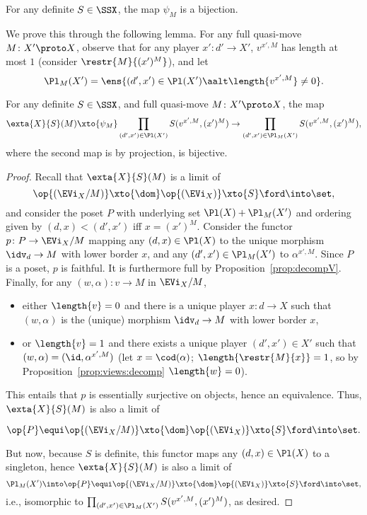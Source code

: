 \documentclass{LMCS}
\theoremstyle{plain}\newtheorem{satz}[thm]{Satz}
\begin{document}
\begin{prop}\label{prop:SM:SdotM}
  For any definite $S \in \SSX$, the map $\psi_M$ is a bijection.
\end{prop}
We prove this through the following lemma.
For any full quasi-move $M \colon X' \proto X$, observe that for any
player $x' \colon d' \to X'$, $v^{x',M}$ has length at most $1$
(consider $\restr{M}{(x')^M}$), and let $$\Pl_M (X') = \ens{(d',x')
  \in \Pl (X') \aalt \length{v^{x',M}} \neq 0}.$$
\begin{lem}\label{lem:psibij}
  For any definite $S \in \SSX$, and full quasi-move $M \colon X' \proto X$,
  the map
  $$\exta{X}{S}(M) \xto{\psi_M} \prod_{(d',x') \in \Pl (X')} S (v^{x',M}, (x')^M) 
  \to \prod_{(d',x') \in \Pl_M (X')} S(v^{x',M}, (x')^M),$$ where the
  second map is by projection, is bijective.
\end{lem}
\begin{proof}
  Recall that $\exta{X}{S}(M)$ is a limit of
  $$\op{(\EVi_X / M)} \xto{\dom} \op{(\EVi_X)} \xto{S} \ford \into \set,$$ 
  and consider the poset $P$ with underlying set $\Pl (X) + \Pl_M
  (X')$ and ordering given by $(d,x) < (d',x')$ iff $x = (x')^M$.
  Consider the functor $p \colon P \to \EVi_X / M$ mapping any $(d,x)
  \in \Pl(X)$ to the unique morphism $\idv_d \to M$ with lower border
  $x$, and any $(d',x') \in \Pl_M (X')$ to $\alpha^{x',M}$. Since $P$
  is a poset, $p$ is faithful.  It is furthermore full by
  Proposition~\ref{prop:decompV}.  Finally,
  for any $(w,\alpha) \colon v \to M$ in $\EVi_X / M$,
  \begin{itemize}
  \item either $\length{v} = 0$ and there is a unique player $x \colon
    d \to X$ such that $(w,\alpha)$ is the (unique) morphism $\idv_d \to M$
    with lower border $x$,
  \item or $\length{v} = 1$ and there exists a unique player $(d',x')
    \in X'$ such that $(w,\alpha) = (\id,\alpha^{x',M})$ (let $x =
    \cod (\alpha)$; $\length{\restr{M}{x}} = 1$, so by
    Proposition~\ref{prop:views:decomp} $\length{w} = 0$).
  \end{itemize}
  This entails that $p$ is essentially surjective on objects, hence an equivalence.
  Thus, $\exta{X}{S}(M)$ is also a limit of 

  $$\op{P} \equi \op{(\EVi_X / M)} \xto{\dom} \op{(\EVi_X)} \xto{S} \ford \into \set.$$ 

  But now, because $S$ is definite, this functor maps any $(d,x) \in
  \Pl (X)$ to a singleton, hence $\exta{X}{S}(M)$ is also a limit of
$$\Pl_M (X')  \into \op{P} \equi \op{(\EVi_X / M)} \xto{\dom} \op{(\EVi_X)} \xto{S} \ford \into \set,$$ 
i.e., isomorphic to $\prod_{(d',x') \in \Pl_M (X')} S(v^{x',M}, (x')^M)$,
as desired.
\end{proof}
\end{document}
